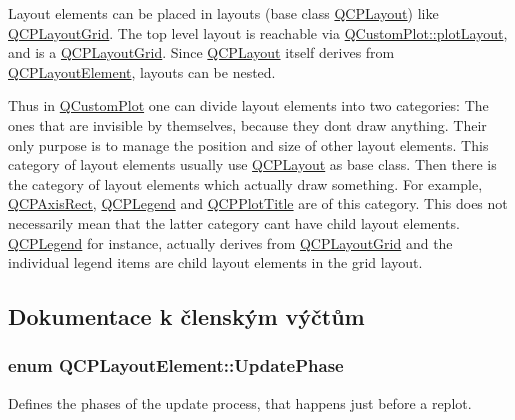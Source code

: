 Layout elements can be placed in layouts (base class \hyperlink{classQCPLayout}{Q\+C\+P\+Layout}) like \hyperlink{classQCPLayoutGrid}{Q\+C\+P\+Layout\+Grid}. The top level layout is reachable via \hyperlink{classQCustomPlot_afd280d4d621ae64a106543a545c508d7}{Q\+Custom\+Plot\+::plot\+Layout}, and is a \hyperlink{classQCPLayoutGrid}{Q\+C\+P\+Layout\+Grid}. Since \hyperlink{classQCPLayout}{Q\+C\+P\+Layout} itself derives from \hyperlink{classQCPLayoutElement}{Q\+C\+P\+Layout\+Element}, layouts can be nested.

Thus in \hyperlink{classQCustomPlot}{Q\+Custom\+Plot} one can divide layout elements into two categories\+: The ones that are invisible by themselves, because they don\textquotesingle{}t draw anything. Their only purpose is to manage the position and size of other layout elements. This category of layout elements usually use \hyperlink{classQCPLayout}{Q\+C\+P\+Layout} as base class. Then there is the category of layout elements which actually draw something. For example, \hyperlink{classQCPAxisRect}{Q\+C\+P\+Axis\+Rect}, \hyperlink{classQCPLegend}{Q\+C\+P\+Legend} and \hyperlink{classQCPPlotTitle}{Q\+C\+P\+Plot\+Title} are of this category. This does not necessarily mean that the latter category can\textquotesingle{}t have child layout elements. \hyperlink{classQCPLegend}{Q\+C\+P\+Legend} for instance, actually derives from \hyperlink{classQCPLayoutGrid}{Q\+C\+P\+Layout\+Grid} and the individual legend items are child layout elements in the grid layout. 

\subsection{Dokumentace k členským výčtům}
\hypertarget{classQCPLayoutElement_a0d83360e05735735aaf6d7983c56374d}{}
\subsubsection[{Update\+Phase}]{\setlength{\rightskip}{0pt plus 5cm}enum {\bf Q\+C\+P\+Layout\+Element\+::\+Update\+Phase}}\label{classQCPLayoutElement_a0d83360e05735735aaf6d7983c56374d}


Defines the phases of the update process, that happens just before a replot. 

